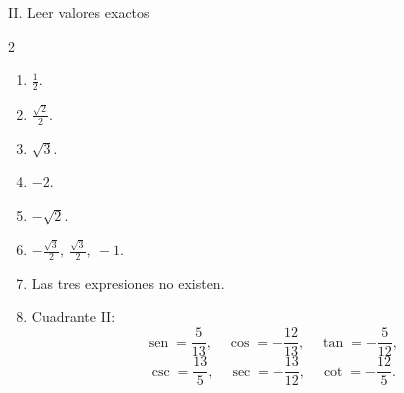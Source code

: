 \documentclass[letterpaper,12pt]{article}
\newcommand{\seno}{\operatorname{sen}}
\begin{document}
\begin{solbox}{II. Leer valores exactos}
\begin{multicols}{2}
\begin{enumerate}[label=\color{azulFuerte}\textbf{\arabic*.},leftmargin=*,start=7]
    \item \(\frac12\).
    \item \(\frac{\sqrt2}{2}\).
    \item \(\sqrt3\).
    \item \(-2\).
    \item \(-\sqrt2\).
    \item \(\displaystyle-\frac{\sqrt3}{2},\ \frac{\sqrt3}{2},\ -1\).
    \item Las tres expresiones no existen.
    \item Cuadrante II:
    \[
    \seno=\frac5{13},\quad
    \cos=-\frac{12}{13},\quad
    \tan=-\frac5{12},
    \]
    \[
    \csc=\frac{13}{5},\quad
    \sec=-\frac{13}{12},\quad
    \cot=-\frac{12}{5}.
    \]
\end{enumerate}
\end{multicols}
\end{solbox}
\end{document}
